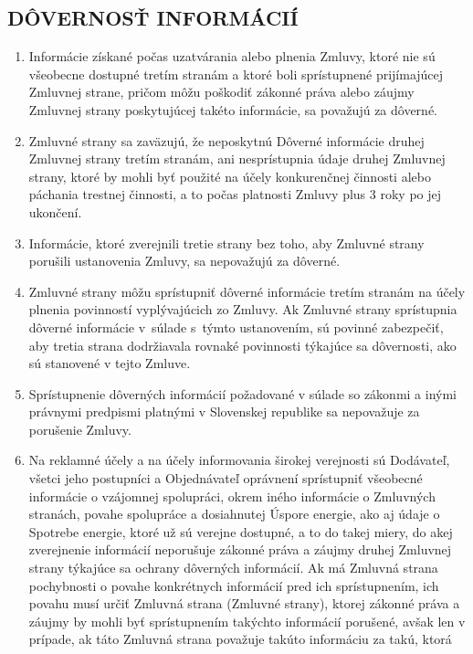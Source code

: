 \begin{multicols}{2}
\subsection{DÔVERNOSŤ INFORMÁCIÍ}

\begin{enumerate}
\def\labelenumi{\arabic{enumi}.}
\item
  Informácie získané počas uzatvárania alebo plnenia Zmluvy, ktoré nie
  sú všeobecne dostupné tretím stranám a ktoré boli sprístupnené
  prijímajúcej Zmluvnej strane, pričom môžu poškodiť zákonné práva alebo
  záujmy Zmluvnej strany poskytujúcej takéto informácie, sa považujú za
  dôverné.
\item
  Zmluvné strany sa zaväzujú, že neposkytnú Dôverné informácie druhej
  Zmluvnej strany tretím stranám, ani nesprístupnia údaje druhej
  Zmluvnej strany, ktoré by mohli byť použité na účely konkurenčnej
  činnosti alebo páchania trestnej činnosti, a to počas platnosti Zmluvy
  plus 3 roky po jej ukončení.
\item
  Informácie, ktoré zverejnili tretie strany bez toho, aby Zmluvné
  strany porušili ustanovenia Zmluvy, sa nepovažujú za dôverné.
\item
  Zmluvné strany môžu sprístupniť dôverné informácie tretím stranám na
  účely plnenia povinností vyplývajúcich zo Zmluvy. Ak Zmluvné strany
  sprístupnia dôverné informácie v~súlade s~týmto ustanovením, sú
  povinné zabezpečiť, aby tretia strana dodržiavala rovnaké povinnosti
  týkajúce sa dôvernosti, ako sú stanovené v tejto Zmluve.
\item
  Sprístupnenie dôverných informácií požadované v súlade so zákonmi a
  inými právnymi predpismi platnými v Slovenskej republike sa nepovažuje
  za porušenie Zmluvy.
\item
  Na reklamné účely a na účely informovania širokej verejnosti sú
  Dodávateľ, všetci jeho postupníci a Objednávateľ oprávnení sprístupniť
  všeobecné informácie o vzájomnej spolupráci, okrem iného informácie o
  Zmluvných stranách, povahe spolupráce a dosiahnutej Úspore energie,
  ako aj údaje o Spotrebe energie, ktoré už sú verejne dostupné, a to do
  takej miery, do akej zverejnenie informácií neporušuje zákonné práva a
  záujmy druhej Zmluvnej strany týkajúce sa ochrany dôverných
  informácií. Ak má Zmluvná strana pochybnosti o povahe konkrétnych
  informácií pred ich sprístupnením, ich povahu musí určiť Zmluvná
  strana (Zmluvné strany), ktorej zákonné práva a záujmy by mohli byť
  sprístupnením takýchto informácií porušené, avšak len v prípade, ak
  táto Zmluvná strana považuje takúto informáciu za takú, ktorá

\end{enumerate}
\end{multicols}

